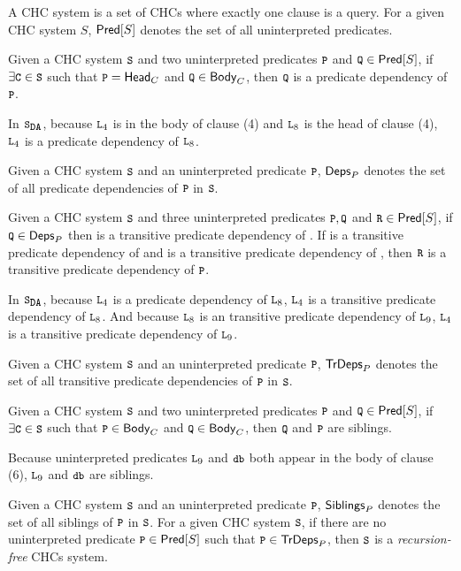 A CHC system is a set of CHCs where exactly one clause is a query.
%
For a given CHC system $S$, $\mathsf{Pred}[ S ]$ denotes the set of all
uninterpreted predicates.

\begin{defn}
  Given a CHC system $\cc{S}$ and two uninterpreted predicates
  $\cc{P}$ and $\cc{Q} \in \predof{S}$, if $\exists \cc{C} \in \cc{S}$
  such that $\cc{P} = \headof{C}$ and $\cc{Q} \in \bodyof{C}$, then
  $\cc{Q}$ is a predicate dependency of $\cc{P}$.
\end{defn}
%
\begin{ex}
  In $\mcchc$, because $\cc{L}_4$ is in the body of clause (4) and
  $\cc{L}_8$ is the head of clause (4), $\cc{L}_4$ is a predicate
  dependency of $\cc{L}_8$.
\end{ex}
%
Given a CHC system $\cc{S}$ and an uninterpreted predicate $\cc{P}$,
$\mathsf{Deps}_{P}$ denotes the set of all predicate dependencies of $\cc{P}$
in $\cc{S}$.
%

\begin{defn}
  Given a CHC system $\cc{S}$ and three uninterpreted predicates
  $\cc{P}, \cc{Q}$ and $\cc{R} \in \predof{S}$, if $\cc{Q} \in
  \depsof{P}$ then  is a transitive predicate dependency of
  .
  If  is a transitive predicate dependency of  and 
  is a transitive predicate dependency of , then $\cc{R}$ is a
  transitive predicate dependency of $\cc{P}$.
\end{defn}
%
\begin{ex}
  In $\mcchc$, because $\cc{L}_4$ is a predicate dependency of
  $\cc{L}_8$, $\cc{L}_4$ is a transitive predicate dependency of
  $\cc{L}_8$.
  And because $\cc{L}_8$ is an transitive predicate dependency of
  $\cc{L}_9$, $\cc{L}_4$ is a transitive predicate dependency of
  $\cc{L}_9$.
\end{ex}
%
Given a CHC system $\cc{S}$ and an uninterpreted predicate $\cc{P}$,
$\mathsf{TrDeps}_{P}$ denotes the set of all transitive predicate dependencies
of $\cc{P}$ in $\cc{S}$.
%

\begin{defn}
  Given a CHC system $\cc{S}$ and two uninterpreted predicates
  $\cc{P}$ and $\cc{Q} \in \predof{S}$, if $\exists \cc{C} \in \cc{S}$
  such that $\cc{P} \in \bodyof{C}$ and $\cc{Q} \in \bodyof{C}$, then
  $\cc{Q}$ and $\cc{P}$ are siblings.
\end{defn}
%
\begin{ex}
  Because uninterpreted predicates $\cc{L}_9$ and $\cc{db}$ both
  appear in the body of clause (6), $\cc{L}_9$ and $\cc{db}$ are
  siblings.
\end{ex}
%
Given a CHC system $\cc{S}$ and an uninterpreted predicate $\cc{P}$,
$\mathsf{Siblings}_{P}$ denotes the set of all siblings of $\cc{P}$
in $\cc{S}$.
%
For a given CHC system $\cc{S}$, if there are no uninterpreted
predicate $\cc{P} \in \predof{S}$ such that $\cc{P} \in \tdepsof{P}$,
then $\cc{S}$ is a \emph{recursion-free} CHCs system.
%

